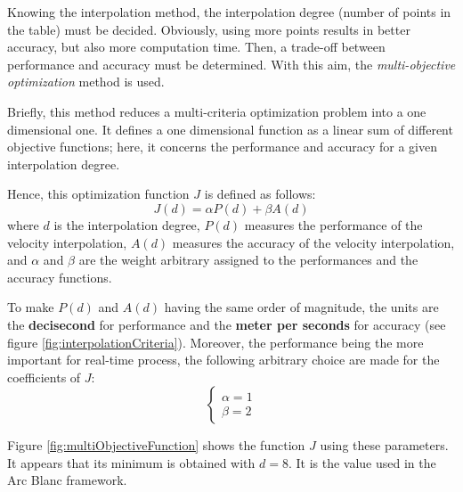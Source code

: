 \documentclass[final]{jcgt}
\def\framework{the Arc Blanc framework\xspace}
\begin{document}
Knowing the interpolation method, the interpolation degree (number of points in the table) must be decided.
Obviously, using more points results in better accuracy, but also more computation time.
Then, a trade-off between performance and accuracy must be determined.
With this aim, the \textit{multi-objective optimization} method is used.

Briefly, this method reduces a multi-criteria optimization problem into a one dimensional one.
It defines a one dimensional function as a linear sum of different objective functions; here, it concerns the performance and accuracy for a given interpolation degree.

Hence, this optimization function $J$ is defined as follows:
\begin{equation}
	J(d) = \alpha P(d) + \beta A(d)
\end{equation}
where $d$ is the interpolation degree, $P(d)$ measures the performance of the velocity interpolation, $A(d)$ measures the accuracy of the velocity interpolation, and $\alpha$ and $\beta$ are the weight arbitrary assigned to the performances and the accuracy functions.

To make $P(d)$ and $A(d)$ having the same order of magnitude, the units are the \textbf{decisecond} for performance and the \textbf{meter per seconds} for accuracy (see figure \ref{fig:interpolationCriteria}).
Moreover, the performance being the more important for real-time process, the following arbitrary choice are made for the coefficients of $J$:
\begin{equation}
	\begin{cases}
		\alpha = 1 \\
		\beta = 2
	\end{cases}
\end{equation}

Figure \ref{fig:multiObjectiveFunction} shows the function $J$ using these parameters. It appears that its minimum is obtained with $d=8$.
It is the value used in \framework.
\end{document}
